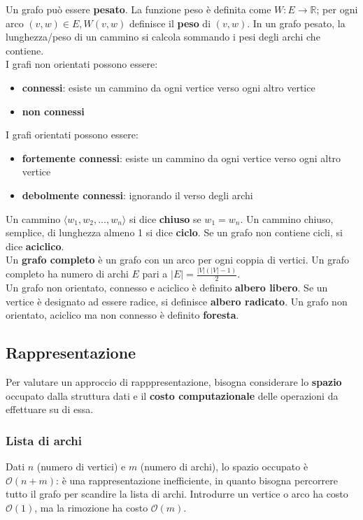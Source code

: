 \documentclass[11pt]{article}
\theoremstyle{remark}
\begin{document}
Un grafo può essere \textbf{pesato}. La funzione peso è definita come $W:E\rightarrow \mathbb{R}$; per ogni arco
$(v,w)\in E,W(v,w)$ definisce il \textbf{peso} di $(v,w)$. In un grafo pesato, la lunghezza/peso di un cammino si calcola 
sommando i pesi degli archi che contiene.\\
I grafi non orientati possono essere:
\begin{itemize}
    \item \textbf{connessi}: esiste un cammino da ogni vertice verso ogni altro vertice
    \item \textbf{non connessi}
\end{itemize}
I grafi orientati possono essere:
\begin{itemize}
    \item \textbf{fortemente connessi}: esiste un cammino da ogni vertice verso ogni altro vertice
    \item \textbf{debolmente connessi}: ignorando il verso degli archi
\end{itemize}
Un cammino $\langle w_1,w_2,...,w_n \rangle$ si dice \textbf{chiuso} se $w_1=w_n$. Un cammino chiuso, semplice, di lunghezza 
almeno 1 si dice \textbf{ciclo}. Se un grafo non contiene cicli, si dice \textbf{aciclico}.\\
Un \textbf{grafo completo} è un grafo con un arco per ogni coppia di vertici. Un grafo completo ha numero di archi $E$ pari 
a $|E| = \frac{|V|(|V|-1)}{2}$.\\
Un grafo non orientato, connesso e aciclico è definito \textbf{albero libero}. Se un vertice è designato ad essere radice, 
si definisce \textbf{albero radicato}. Un grafo non orientato, aciclico ma non connesso è definito \textbf{foresta}.
\subsection{Rappresentazione}
Per valutare un approccio di rapppresentazione, bisogna considerare lo \textbf{spazio} occupato dalla struttura dati e il 
\textbf{costo computazionale} delle operazioni da effettuare su di essa.
\subsubsection{Lista di archi}
Dati $n$ (numero di vertici) e $m$ (numero di archi), lo spazio occupato è $\mathcal{O}(n+m)$: è una rappresentazione 
inefficiente, in quanto bisogna percorrere tutto il grafo per scandire la lista di archi. Introdurre un vertice o arco ha 
costo $\mathcal{O}(1)$, ma la rimozione ha costo $\mathcal{O}(m)$.
\end{document}

